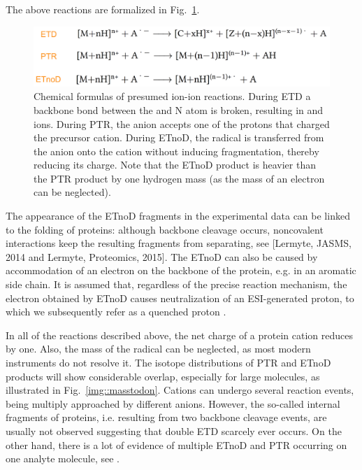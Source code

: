 \documentclass{llncs}
\begin{document}
        The above reactions are formalized in Fig.~\ref{img::reactions}.
        \begin{figure}[h]
                \center
                \includegraphics[width=.8\textwidth]{reactions.png}
                \caption{Chemical formulas of presumed ion-ion reactions. During ETD a backbone bond between the  and N atom is broken, resulting in  and  ions. During PTR, the anion accepts one of the protons that charged the precursor cation. During ETnoD, the radical is transferred from the anion onto the cation without inducing fragmentation, thereby reducing its charge. Note that the ETnoD product is heavier than the PTR product by one hydrogen mass (as the mass of an electron can be neglected).}\label{img::reactions}
        \end{figure}

        The appearance of the ETnoD fragments in the experimental data can be linked to the folding of proteins: although backbone cleavage occurs, noncovalent interactions keep the resulting fragments from separating, see \cite{Lermyte2014-vu,Lermyte2015-oy} [Lermyte, JASMS, 2014 and Lermyte, Proteomics, 2015]. The ETnoD can also be caused by accommodation of an electron on the backbone of the protein, e.g. in an aromatic side chain. It is assumed that, regardless of the precise reaction mechanism, the electron obtained by ETnoD causes neutralization of an ESI-generated proton, to which we subsequently refer as a quenched proton \cite{Lermyte2015-lm}.

        In all of the reactions described above, the net charge of a protein cation reduces by one. Also, the mass of the radical can be neglected, as most modern instruments do not resolve it. The isotope distributions of PTR and ETnoD products will show considerable overlap, especially for large molecules, as illustrated in Fig.~\ref{img::masstodon}. Cations can undergo several reaction events, being multiply approached by different anions. However, the so-called internal fragments of proteins, i.e. resulting from two backbone cleavage events, are usually not observed suggesting that double ETD scarcely ever occurs. On the other hand, there is a lot of evidence of multiple ETnoD and PTR occurring on one analyte molecule, see \cite{Lermyte2015-xg}.
\end{document}
